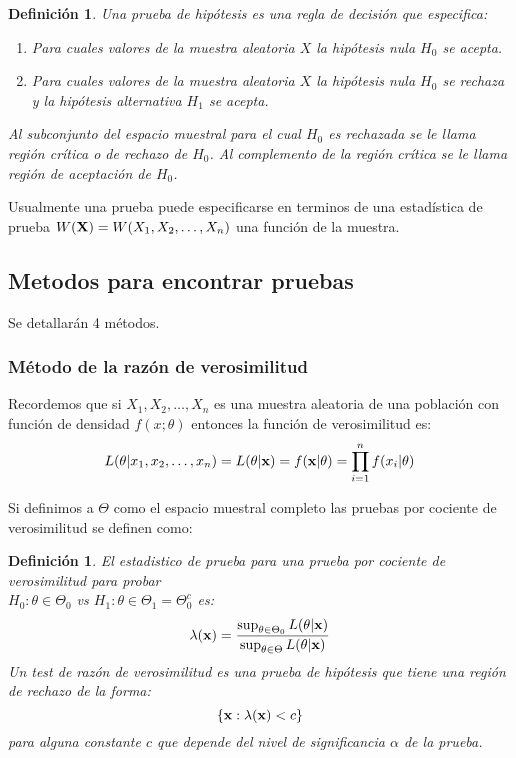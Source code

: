 \documentclass[14pt]{extarticle}
\newtheorem{definition}[theorem]{Definición}
\begin{document}
\begin{definition}
    Una prueba de hipótesis es una regla de decisión que especifica:
    \begin{enumerate}
        \item Para cuales valores de la muestra aleatoria $X$ la hipótesis nula $H_0$ se acepta.
        \item Para cuales valores de la muestra aleatoria $X$ la hipótesis nula $H_0$ se rechaza y la hipótesis alternativa $H_1$ se acepta.
    \end{enumerate}
    Al subconjunto del espacio muestral para el cual $H_0$ es rechazada se le llama región crítica o de rechazo de $H_0$. Al complemento de la región crítica
    se le llama región de aceptación de $H_0$.
\end{definition}

Usualmente una prueba puede especificarse en terminos de una estadística de prueba $W(\bold{X})=W(X_1, X_2, \ldots, X_n)$ una función 
de la muestra.

\subsection{Metodos para encontrar pruebas}
Se detallarán 4 métodos.

\subsubsection{Método de la razón de verosimilitud}

Recordemos que si $X_1, X_2, \ldots, X_n$ es una muestra aleatoria de una población con función de densidad $f(x;\theta)$ entonces la función de verosimilitud
es:
$$L(\theta | x_1, x_2, \ldots, x_n) = L(\theta | \bold{x}) = f(\bold{x}| \theta) = \prod_{i=1}^n f(x_i|\theta)$$

Si definimos a $\Theta$ como el espacio muestral completo las pruebas por cociente de verosimilitud se definen como:

\begin{definition}
    El estadistico de prueba para una prueba por cociente de verosimilitud para probar\\
     $H_0: \theta \in \Theta_0$ vs $H_1: \theta \in \Theta_1 = \Theta_0^c$ es:
    $$ \lambda(\bold{x}) = \frac{\sup_{\theta \in \Theta_0} L(\theta | \bold{x})}{\sup_{\theta \in \Theta} L(\theta | \bold{x})} $$
    Un test de razón de verosimilitud es una prueba de hipótesis que tiene una región de rechazo de la forma:
    $$ \{ \bold{x}: \lambda(\bold{x}) < c \} $$
    para alguna constante $c$ que depende del nivel de significancia $\alpha$ de la prueba.
\end{definition}
\end{document}
